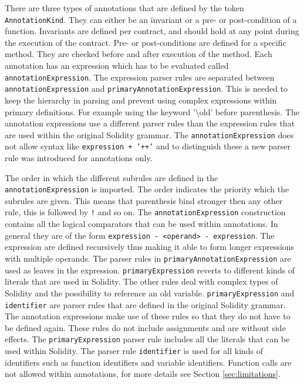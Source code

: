 \documentclass[a4paper]{article}
\begin{document}
There are three types of annotations that are defined by the token \texttt{AnnotationKind}. They can either be an invariant or a pre- or post-condition of a function. Invariants are defined per contract, and should hold at any point during the execution of the contract. Pre- or post-conditions are defined for a specific method. They are checked before and after execution of the method. Each annotation has an expression which has to be evaluated called \texttt{annotationExpression}. The expression parser rules are separated between \texttt{annotationExpression} and \texttt{primaryAnnotationExpression}. This is needed to keep the hierarchy in parsing and prevent using complex expressions within primary definitions. For example using the keyword '\textbackslash old' before parenthesis. The annotation expressions use a different parser rules than the expression rules that are used within the original Solidity grammar. The \texttt{annotationExpression} does not allow syntax like \texttt{expression + '++'} and to distinguish these a new parser rule was introduced for annotations only. \par
The order in which the different subrules are defined in the \texttt{annotationExpression} is imported. The order indicates the priority which the subrules are given. This means that parenthesis bind stronger then any other rule, this is followed by \texttt{!} and so on. The \texttt{annotationExpression} construction contains all the logical comparators that can be used within annotations. In general they are of the form \texttt{expression - <operand> - expression}. The expression are defined recursively thus making it able to form longer expressions with multiple operands. The parser rules in \texttt{primaryAnnotationExpression} are used as leaves in the expression. \texttt{primaryExpression} reverts to different kinds of literals that are used in Solidity. The other rules deal with complex types of Solidity and the possibility to reference an old variable.  
\texttt{primaryExpression} and \texttt{identifier} are parser rules that are defined in the original Solidity grammar. The annotation expressions make use of these rules so that they do not have to be defined again. These rules do not include assignments and are without side effects. The \texttt{primaryExpression} parser rule includes all the literals that can be used within Solidity. The parser rule \texttt{identifier} is used for all kinds of identifiers such as function identifiers and variable identifiers. Function calls are not allowed within annotations, for more details see Section \ref{sec:limitations}.
\end{document}
